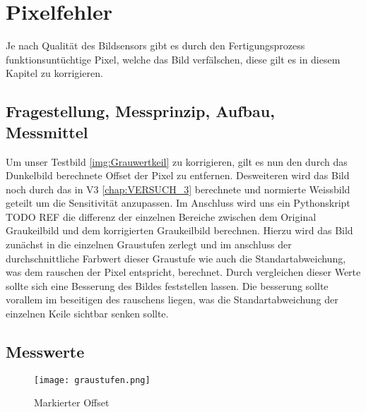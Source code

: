 %
%
\chapter{Pixelfehler}
Je nach Qualität des Bildsensors gibt es durch den Fertigungsprozess funktionsuntüchtige Pixel, welche das Bild verfälschen, diese gilt es in diesem Kapitel zu korrigieren.
\label{chap:Pixelfehler}

\section{Fragestellung, Messprinzip, Aufbau, Messmittel}
Um unser Testbild \ref{img:Grauwertkeil} zu korrigieren, gilt es nun den durch das Dunkelbild berechnete Offset der Pixel zu entfernen. Desweiteren wird das Bild noch durch das in V3 \ref{chap:VERSUCH_3} berechnete und normierte Weissbild geteilt um die Sensitivität anzupassen.
Im Anschluss wird uns ein Pythonskript TODO REF die differenz der einzelnen Bereiche zwischen dem Original Graukeilbild und dem korrigierten Graukeilbild berechnen. Hierzu wird das Bild zunächst in die einzelnen Graustufen zerlegt und im anschluss der durchschnittliche Farbwert dieser Graustufe wie auch die Standartabweichung, was dem rauschen der Pixel entspricht, berechnet. Durch vergleichen dieser Werte sollte sich eine Besserung des Bildes feststellen lassen. Die besserung sollte vorallem im beseitigen des rauschens liegen, was die Standartabweichung der einzelnen Keile sichtbar senken sollte.
\label{chap:VERSUCH_4_FRAGESTELLUNG}

\section{Messwerte}
\begin{figure}[H]
\centering
\texttt{[image: graustufen.png]}
\caption{Markierter Offset}
\label{img:struckpixel.png}
\end{figure}
\label{chap:VERSUCH_4_MESSWERTE}

